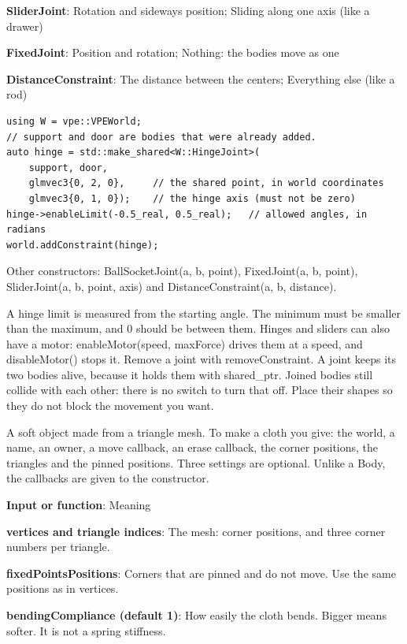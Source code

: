 \documentclass[11pt,a4paper]{article}
\begin{document}
\textbf{SliderJoint}: Rotation and sideways position; Sliding along one axis (like a drawer)

\textbf{FixedJoint}: Position and rotation; Nothing: the bodies move as one

\textbf{DistanceConstraint}: The distance between the centers; Everything else (like a rod)

\begin{lstlisting}
using W = vpe::VPEWorld;
// support and door are bodies that were already added.
auto hinge = std::make_shared<W::HingeJoint>(
    support, door,
    glmvec3{0, 2, 0},     // the shared point, in world coordinates
    glmvec3{0, 1, 0});    // the hinge axis (must not be zero)
hinge->enableLimit(-0.5_real, 0.5_real);   // allowed angles, in radians
world.addConstraint(hinge);
\end{lstlisting}

Other constructors: BallSocketJoint(a, b, point), FixedJoint(a, b, point), SliderJoint(a, b, point, axis) and DistanceConstraint(a, b, distance).

A hinge limit is measured from the starting angle. The minimum must be smaller than the maximum, and 0 should be between them. Hinges and sliders can also have a motor: enableMotor(speed, maxForce) drives them at a speed, and disableMotor() stops it. Remove a joint with removeConstraint. A joint keeps its two bodies alive, because it holds them with shared\_ptr. Joined bodies still collide with each other: there is no switch to turn that off. Place their shapes so they do not block the movement you want.

\label{vpe-core-8}
A soft object made from a triangle mesh. To make a cloth you give: the world, a name, an owner, a move callback, an erase callback, the corner positions, the triangles and the pinned positions. Three settings are optional. Unlike a Body, the callbacks are given to the constructor.

\textbf{Input or function}: Meaning

\textbf{vertices and triangle indices}: The mesh: corner positions, and three corner numbers per triangle.

\textbf{fixedPointsPositions}: Corners that are pinned and do not move. Use the same positions as in vertices.

\textbf{bendingCompliance (default 1)}: How easily the cloth bends. Bigger means softer. It is not a spring stiffness.
\end{document}
